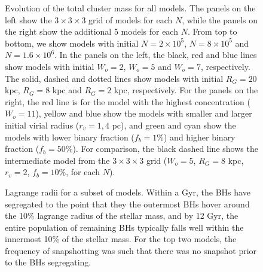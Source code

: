 \documentclass[12pt,preprint]{aastex}
\begin{document}
\begin{figure}[!h]
	\caption{Evolution of the total cluster mass for all models. The panels on the left show the $3 \times 3 \times 3$  grid of models for each $N$, while the panels on the right show the additional 5 models for each $N$. From top to bottom, we show models with initial $N=2 \times 10^5$, $N=8 \times 10^5$ and $N=1.6 \times 10^6$. In the panels on the left, the black, red and blue lines show models with initial $W_o=2$, $W_o=5$ and $W_o=7$, respectively. The solid, dashed and dotted lines show models with initial $R_G=20$ kpc, $R_G=8$ kpc and $R_G=2$ kpc, respectively. For the panels on the right, the red line is for the model with the highest concentration ($W_o=11$), yellow and blue show the models with smaller and larger initial virial radius ($r_v = 1, 4$ pc), and green and cyan show the models with lower binary fraction ($f_b=1$\%) and higher binary fraction ($f_b=50$\%). For comparison, the black dashed line shows the intermediate model from the $3 \times 3 \times 3$ grid ($W_o=5$, $R_G=8$ kpc, $r_v=2$, $f_b=10$\%, for each $N$).
	}
	
	\label{fig:mass_evolution}
\end{figure}





\begin{figure}[!h]
	\caption{Lagrange radii for a subset of models. Within a Gyr, the BHs have segregated to the point that they the outermost BHs hover around the 10\% lagrange radius of the stellar mass, and by 12 Gyr, the entire population of remaining BHs typically falls  well within the innermost 10\% of the stellar mass. For the top two models, the frequency of snapshotting was such that there was no snapshot prior to the BHs segregating.
	}
	
	\label{fig:LagRad}
\end{figure}
\end{document}
